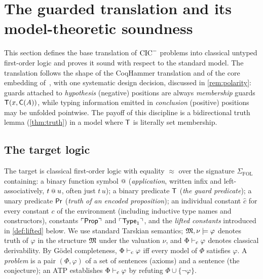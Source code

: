 \section{The guarded translation and its model-theoretic soundness}
\label{sec:translation}

This section defines the base translation of $\mathrm{CIC}^{-}$ problems into
classical untyped first-order logic and proves it sound with respect
to the standard model.  The translation follows the shape of the
CoqHammer translation \cite[\S5.2]{CzajkaKaliszyk2018} and of the
core embedding of~\cite{Czajka2016}, with one systematic design
decision, discussed in \cref{rem:polarity}: guards attached to
\emph{hypothesis} (negative) positions are always \emph{membership}
guards $\mathsf{T}(x, \mathsf{C}(A))$, while typing information emitted in
\emph{conclusion} (positive) positions may be unfolded pointwise.
The payoff of this discipline is a bidirectional truth lemma
(\cref{thm:truth}) in a model where $\mathsf{T}$ is literally set
membership.

\subsection{The target logic}

\begin{definition}
\label{def:fol}
The target is classical first-order logic with equality $\approx$
over the signature $\Sigma_{\mathrm{FOL}}$ containing: a binary
function symbol $\app$ (\emph{application}, written infix and
left-associatively, $t\app u$, often just $t\,u$); a binary predicate
$\mathsf{T}$ (\emph{the guard predicate}); a unary predicate $\mathsf{Pr}$
(\emph{truth of an encoded proposition}); an individual constant
$\hat{c}$ for every constant $c$ of the environment (including
inductive type names and constructors), constants $\ulcorner \mathsf{Prop} \urcorner$ and
$\ulcorner \mathsf{Type}_1 \urcorner$, and the \emph{lifted constants} introduced in
\cref{def:lifted} below.  We use standard Tarskian semantics;
$\mathfrak{M}, \nu \models \varphi$ denotes truth of $\varphi$ in the
structure $\mathfrak{M}$ under the valuation $\nu$, and $\Phi \vdash_{\mathrm{c}}
\varphi$ denotes classical derivability.  By G\"odel completeness,
$\Phi \vdash_{\mathrm{c}} \varphi$ iff every model of $\Phi$ satisfies
$\varphi$.  A \emph{problem} is a pair $(\Phi, \varphi)$ of a set of
sentences (axioms) and a sentence (the conjecture); an ATP
establishes $\Phi \vdash_{\mathrm{c}} \varphi$ by refuting $\Phi \cup
\{\neg\varphi\}$.
\end{definition}

